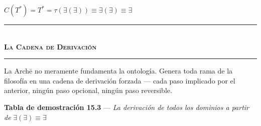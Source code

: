 \documentclass[10pt, openany, oneside]{book}
\renewcommand{\normalsize}{\fontsize{10}{13}\selectfont}
\begin{document}
\begin{center}
    $C(T^*) = T^* = \tau(\exists(\exists)) \equiv \exists(\exists) \equiv \exists$
\end{center}

\vspace{1.5em}


\pagebreak

\begin{center}
    \rule{0.3\textwidth}{0.4pt}\\[0.5em]
    {\normalsize\bfseries\scshape La Cadena de Derivación}\\[0.3em]
    \rule{0.3\textwidth}{0.4pt}
\end{center}

\vspace{0.5em}

\noindent La Arch\={e} no meramente fundamenta la ontología. Genera toda rama de la filosofía en una cadena de derivación forzada --- cada paso implicado por el anterior, ningún paso opcional, ningún paso reversible.

\vspace{0.3em}

\textbf{Tabla de demostración 15.3} --- \textit{La derivación de todos los dominios a partir de} $\exists(\exists) \equiv \exists$

\vspace{0.5em}
\end{document}
